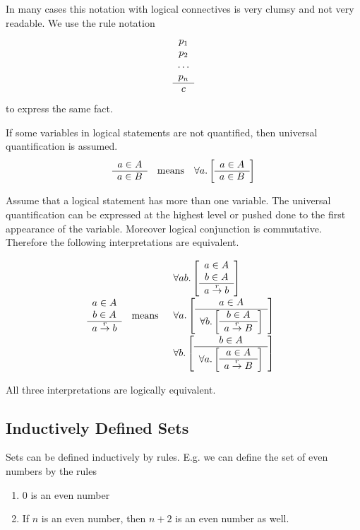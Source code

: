 In many cases this notation with logical connectives is very clumsy and not very
readable. We use the rule notation
$$
\begin{array}{c} p_1 \\ p_2 \\ \ldots \\ p_n \\ \hline c\end{array}
$$
to express the same fact.


If some variables in logical statements are not quantified, then universal
quantification is assumed.
$$
\begin{array}{ccc}

    \ruleh{a \in A}{a \in B}
    &
    \text{means}
    &
    \allbracket a {\ruleh {a \in A}{a \in B}}

\end{array}
$$

Assume that a logical statement has more than one variable. The universal
quantification can be expressed at the highest level or pushed done to the first
appearance of the variable. Moreover logical conjunction is commutative.
Therefore the following interpretations are equivalent.

$$
\begin{array}{ccc}
    \begin{array}{c} a \in A \\ b \in A \\ \hline a \stackrel{r}{\to} b\end{array}
    &
    \text{means}
    &
    \begin{array}{l}
        \forall ab. \left[ \begin{array}{c} a \in A \\ b \in A \\ \hline a \stackrel{r}{\to} b\end{array} \right]
        \\
        \forall a. \left[ 
            \begin{array}{c} a \in A \\ \hline \forall b. \left[ \begin{array}{c} b \in A \\ \hline a \stackrel{r}{\to} B\end{array} \right]\end{array}
         \right]
        \\
        \forall b. \left[ 
            \begin{array}{c} b \in A \\ \hline \forall a. \left[ \begin{array}{c} a \in A \\ \hline a \stackrel{r}{\to} B\end{array} \right]\end{array}
         \right]
    \end{array}
\end{array}
$$

All three interpretations are logically equivalent.




\subsection{Inductively Defined Sets}

Sets can be defined inductively by rules. E.g. we can define the set of even
numbers by the rules

\begin{enumerate}
\item $0$ is an even number

\item If $n$ is an even number, then $n+2$ is an even number as well.
\end{enumerate}

